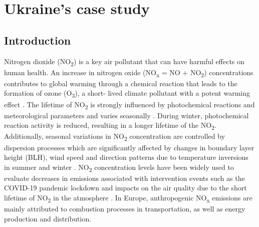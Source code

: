 \chapter{Ukraine's case study} \label{chap3}
\renewcommand{\headrulewidth}{0pt}
\lhead[\thepage]{\leftmark}
\rhead[\leftmark]{\thepage}
\cfoot[]{}
\section{Introduction}
Nitrogen dioxide (NO\textsubscript{2}) is a key air pollutant that can have harmful effects on human health. An increase in nitrogen oxide (NO\textsubscript{x} = NO + NO\textsubscript{2}) concentrations contributes to global warming through a chemical reaction that leads to the formation of ozone (O\textsubscript{3}), a short- lived climate pollutant with a potent warming effect \citep{ipcc2013}. The lifetime of NO\textsubscript{2} is strongly influenced by photochemical reactions and meteorological parameters \citep{barre2021estimating} and varies seasonally \citep{dragomir2015modeling,kendrick2015diurnal}. During winter, photochemical reaction activity is reduced, resulting in a longer lifetime of the NO\textsubscript{2}. Additionally, seasonal variations in NO\textsubscript{2} concentration are controlled by dispersion processes which are significantly affected by changes in boundary layer height (BLH), wind speed and direction patterns due to temperature inversions in summer and winter \citep{barre2021estimating,kendrick2015diurnal}. NO\textsubscript{2} concentration levels have been widely used to evaluate decreases in emissions associated with intervention events such as the COVID-19 pandemic lockdown and impacts on the air quality due to the short lifetime of NO\textsubscript{2} in the atmosphere \citep{barre2021estimating,cooper2022global}.
In Europe, anthropogenic NO\textsubscript{x} emissions are mainly attributed to combustion processes in transportation, as well as energy production and distribution. \par

